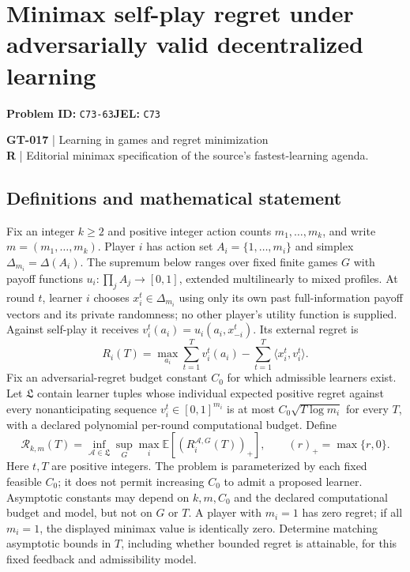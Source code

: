 \documentclass[11pt,a4paper]{article}
\begin{document}
\section*{Minimax self-play regret under adversarially valid decentralized learning}
\textbf{Problem ID:} \texttt{C73-63}\quad \textbf{JEL:} \texttt{C73}\par
\label{problem:OP-0147}
\label{game:GT-017}
{\sffamily\small\color{muted}
\textbf{GT-017} | Learning in games and regret minimization\\
\textbf{R} | Editorial minimax specification of the source's fastest-learning agenda.
\par}
\subsection*{Definitions and mathematical statement}
Fix an integer $k\geq2$ and positive integer action counts $m_1,\ldots,m_k$, and write $m=(m_1,\ldots,m_k)$. Player $i$ has action set $A_i=\{1,\ldots,m_i\}$ and simplex $\Delta_{m_i}=\Delta(A_i)$. The supremum below ranges over fixed finite games $G$ with payoff functions $u_i:\prod_j A_j\to[0,1]$, extended multilinearly to mixed profiles. At round $t$, learner $i$ chooses $x_i^t\in\Delta_{m_i}$ using only its own past full-information payoff vectors and its private randomness; no other player's utility function is supplied. Against self-play it receives $v_i^t(a_i)=u_i(a_i,x_{-i}^t)$. Its external regret is
\[
 R_i(T)=\max_{a_i}\sum_{t=1}^Tv_i^t(a_i)-
 \sum_{t=1}^T\langle x_i^t,v_i^t\rangle.
\]
Fix an adversarial-regret budget constant $C_0$ for which admissible learners exist. Let $\mathfrak L$ contain learner tuples whose individual expected positive regret against every nonanticipating sequence $v_i^t\in[0,1]^{m_i}$ is at most $C_0\sqrt{T\log m_i}$ for every $T$, with a declared polynomial per-round computational budget. Define
\[
 \mathcal R_{k,m}(T)=\inf_{\mathcal A\in\mathfrak L}\sup_G
 \max_i\mathbb E[(R_i^{\mathcal A,G}(T))_+],\qquad (r)_+=\max\{r,0\}.
\]
Here $t,T$ are positive integers. The problem is parameterized by each fixed feasible $C_0$; it does not permit increasing $C_0$ to admit a proposed learner. Asymptotic constants may depend on $k,m,C_0$ and the declared computational budget and model, but not on $G$ or $T$. A player with $m_i=1$ has zero regret; if all $m_i=1$, the displayed minimax value is identically zero. Determine matching asymptotic bounds in $T$, including whether bounded regret is attainable, for this fixed feedback and admissibility model.
\end{document}
